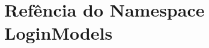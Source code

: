 \hypertarget{namespaceLoginModels}{\section{Refência do Namespace Login\-Models}
\label{d1/d0f/namespaceLoginModels}
}
